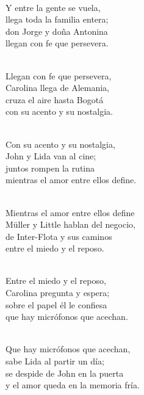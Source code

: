 \begin{lyrics}
\\
Y entre la gente se vuela,\\
llega toda la familia entera;\\
don Jorge y doña Antonina\\
llegan con fe que persevera.

\\
Llegan con fe que persevera,\\
Carolina llega de Alemania,\\
cruza el aire hasta Bogotá\\
con su acento y su nostalgia.

\\
Con su acento y su nostalgia,\\
John y Lida van al cine;\\
juntos rompen la rutina\\
mientras el amor entre ellos define.

\\
Mientras el amor entre ellos define\\
Müller y Little hablan del negocio,\\
de Inter-Flota y sus caminos\\
entre el miedo y el reposo.

\\
Entre el miedo y el reposo,\\
Carolina pregunta y espera;\\
sobre el papel él le confiesa\\
que hay micrófonos que acechan.

\\
Que hay micrófonos que acechan,\\
sabe Lida al partir un día;\\
se despide de John en la puerta\\
y el amor queda en la memoria fría.
\end{lyrics}

